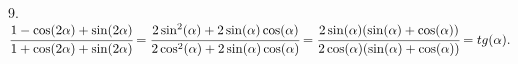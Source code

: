 9. $\cfrac{1-\cos(2\alpha)+\sin(2\alpha)}{1+\cos(2\alpha)+\sin(2\alpha)}=
\cfrac{2\sin^2(\alpha)+2\sin(\alpha)\cos(\alpha)}{2\cos^2(\alpha)+2\sin(\alpha)\cos(\alpha)}=
\cfrac{2\sin(\alpha)(\sin(\alpha)+\cos(\alpha))}{2\cos(\alpha)(\sin(\alpha)+\cos(\alpha))}=tg(\alpha).$\\
